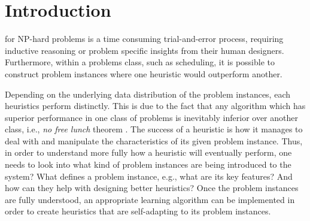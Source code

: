 

\chapter{Introduction}\label{ch:introduction} 

 for NP-hard problems is a time consuming trial-and-error process, requiring inductive reasoning or problem specific insights from their human designers. Furthermore, within a problems class, such as scheduling, it is possible to construct problem instances where one heuristic would outperform another. 

Depending on the underlying data distribution of the problem instances, each 
heuristics perform distinctly. This is due to the fact that any algorithm which 
has superior performance in one class of problems is inevitably inferior over 
another class, i.e., \emph{no free lunch} theorem \citep{Wolpert97nofree}. 
The success of a heuristic is how it manages to deal with and manipulate the 
characteristics of its given problem instance. Thus, in order to understand 
more fully how a heuristic will eventually perform, one needs to look into what 
kind of problem instances are being introduced to the system? What defines a 
problem instance, e.g., what are its key features? And how can they help with 
designing better heuristics? Once the problem instances are fully understood, 
an appropriate learning algorithm can be implemented in order to create 
heuristics that are  self-adapting to its problem instances.

